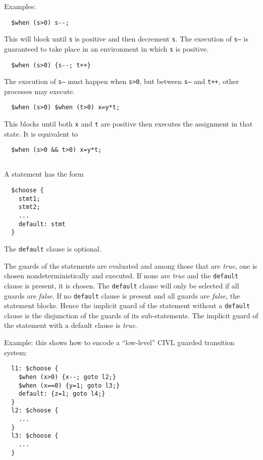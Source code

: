 Examples:
\begin{verbatim}
  $when (s>0) s--;
\end{verbatim}
This will block until \texttt{s} is positive and then decrement
\texttt{s}.  The execution of \texttt{s--} is guaranteed to take place
in an environment in which \texttt{s} is positive.

\begin{verbatim}
  $when (s>0) {s--; t++}
\end{verbatim}
The execution of \texttt{s--} must happen when \texttt{s>0}, but
between \texttt{s--} and \texttt{t++}, other processes may execute.

\begin{verbatim}
  $when (s>0) $when (t>0) x=y*t;
\end{verbatim}
This blocks until both \texttt{x} and \texttt{t} are positive then
executes the assignment in that state.  It is equivalent to
\begin{verbatim}
  $when (s>0 && t>0) x=y*t;
\end{verbatim}

\subsection{\cchoose}  A \cchoose{} statement has the form
\begin{verbatim}
  $choose {
    stmt1;
    stmt2;
    ...
    default: stmt
  }
\end{verbatim}
The \texttt{default} clause is optional.

The guards of the statements are evaluated and among those that are
\emph{true}, one is chosen nondeterministically and executed.  If none
are \emph{true} and the \texttt{default} clause is present, it is
chosen.  The \texttt{default} clause will only be selected if all
guards are \emph{false}.  If no \texttt{default} clause is present and
all guards are \emph{false}, the statement blocks.  Hence the implicit
guard of the \cchoose{} statement without a \texttt{default} clause is
the disjunction of the guards of its sub-statements.  The implicit
guard of the \cchoose{} statement with a default clause is
\emph{true}.

Example: this shows how to encode a ``low-level'' CIVL guarded
transition system:

\begin{verbatim}
  l1: $choose {
    $when (x>0) {x--; goto l2;}
    $when (x==0) {y=1; goto l3;}
    default: {z=1; goto l4;}
  }
  l2: $choose {
    ...
  }
  l3: $choose {
    ...
  }
\end{verbatim}


